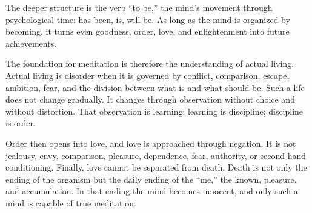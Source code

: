 The deeper structure is the verb ``to be,'' the mind's movement through psychological time: has been, is, will be. As long as the mind is organized by becoming, it turns even goodness, order, love, and enlightenment into future achievements.

The foundation for meditation is therefore the understanding of actual living. Actual living is disorder when it is governed by conflict, comparison, escape, ambition, fear, and the division between what is and what should be. Such a life does not change gradually. It changes through observation without choice and without distortion. That observation is learning; learning is discipline; discipline is order.

Order then opens into love, and love is approached through negation. It is not jealousy, envy, comparison, pleasure, dependence, fear, authority, or second-hand conditioning. Finally, love cannot be separated from death. Death is not only the ending of the organism but the daily ending of the ``me,'' the known, pleasure, and accumulation. In that ending the mind becomes innocent, and only such a mind is capable of true meditation.